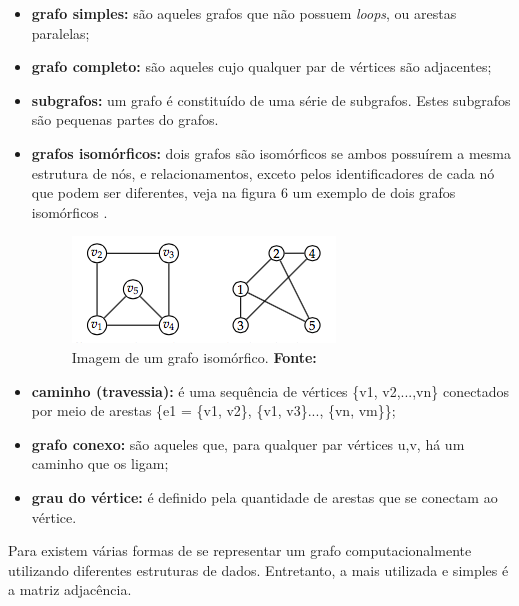 \begin{itemize}
	\item \textbf{grafo simples:} são aqueles grafos que não possuem \textit{loops}, ou arestas paralelas;
	
	\item \textbf{grafo completo:} são aqueles cujo qualquer par de vértices são adjacentes;
	
	\item \textbf{subgrafos:} um grafo é constituído de uma série de subgrafos. Estes subgrafos são pequenas partes do grafos.
	
	\item \textbf{grafos isomórficos:} dois grafos são isomórficos se ambos possuírem a mesma estrutura de nós, e relacionamentos, exceto pelos identificadores de cada nó que podem ser diferentes, veja na figura 6 um exemplo de dois grafos isomórficos \cite{harju_graph_theory}.
	
	\begin{figure}[h!]
		\centerline{\includegraphics[scale=1]{./imagens/grafos_isomorficos.png}}
		\caption[Imagem de um grafo isomórfico]
		{Imagem de um grafo isomórfico. \textbf{Fonte:} }
		\label{fig:exemplo1}
	\end{figure}
	
	\item \textbf{caminho (travessia):} é uma sequência de vértices \{v1, v2,...,vn\} conectados por meio de arestas \{e1 = \{v1, v2\}, \{v1, v3\}..., \{vn, vm\}\};

	\item \textbf{grafo conexo:} são aqueles que, para qualquer par vértices {u,v}, há um caminho que os ligam;
	
	\item \textbf{grau do vértice:} é definido pela quantidade de arestas que se conectam ao vértice.
	
\end{itemize}

Para  existem várias formas de se representar um grafo computacionalmente utilizando diferentes estruturas de dados. Entretanto, a mais utilizada e simples é a matriz adjacência.


